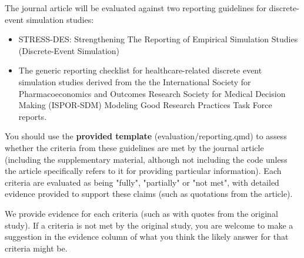 The journal article will be evaluated against two reporting guidelines for discrete-event simulation studies:
\begin{itemize}
    \item STRESS-DES: Strengthening The Reporting of Empirical Simulation Studies (Discrete-Event Simulation)\autocite{monks_strengthening_2019}
    \item The generic reporting checklist for healthcare-related discrete event simulation studies derived from the the International Society for Pharmacoeconomics and Outcomes Research Society for Medical Decision Making (ISPOR-SDM) Modeling Good Research Practices Task Force reports.\autocite{zhang_reporting_2020}
\end{itemize}

You should use the \textbf{provided template} (evaluation/reporting.qmd) to assess whether the criteria from these guidelines are met by the journal article (including the supplementary material, although not including the code unless the article specifically refers to it for providing particular information). Each criteria are evaluated as being "fully", "partially" or "not met", with detailed evidence provided to support these claims (such as quotations from the article).

We provide evidence for each criteria (such as with quotes from the original study). If a criteria is not met by the original study, you are welcome to make a suggestion in the evidence column of what you think the likely answer for that criteria might be.